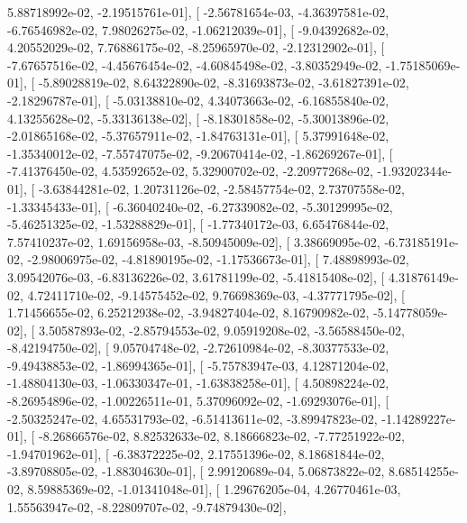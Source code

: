 \documentclass{article}
\begin{document}
          5.88718992e-02,  -2.19515761e-01],
       [ -2.56781654e-03,  -4.36397581e-02,  -6.76546982e-02,
          7.98026275e-02,  -1.06212039e-01],
       [ -9.04392682e-02,   4.20552029e-02,   7.76886175e-02,
         -8.25965970e-02,  -2.12312902e-01],
       [ -7.67657516e-02,  -4.45676454e-02,  -4.60845498e-02,
         -3.80352949e-02,  -1.75185069e-01],
       [ -5.89028819e-02,   8.64322890e-02,  -8.31693873e-02,
         -3.61827391e-02,  -2.18296787e-01],
       [ -5.03138810e-02,   4.34073663e-02,  -6.16855840e-02,
          4.13255628e-02,  -5.33136138e-02],
       [ -8.18301858e-02,  -5.30013896e-02,  -2.01865168e-02,
         -5.37657911e-02,  -1.84763131e-01],
       [  5.37991648e-02,  -1.35340012e-02,  -7.55747075e-02,
         -9.20670414e-02,  -1.86269267e-01],
       [ -7.41376450e-02,   4.53592652e-02,   5.32900702e-02,
         -2.20977268e-02,  -1.93202344e-01],
       [ -3.63844281e-02,   1.20731126e-02,  -2.58457754e-02,
          2.73707558e-02,  -1.33345433e-01],
       [ -6.36040240e-02,  -6.27339082e-02,  -5.30129995e-02,
         -5.46251325e-02,  -1.53288829e-01],
       [ -1.77340172e-03,   6.65476844e-02,   7.57410237e-02,
          1.69156958e-03,  -8.50945009e-02],
       [  3.38669095e-02,  -6.73185191e-02,  -2.98006975e-02,
         -4.81890195e-02,  -1.17536673e-01],
       [  7.48898993e-02,   3.09542076e-03,  -6.83136226e-02,
          3.61781199e-02,  -5.41815408e-02],
       [  4.31876149e-02,   4.72411710e-02,  -9.14575452e-02,
          9.76698369e-03,  -4.37771795e-02],
       [  1.71456655e-02,   6.25212938e-02,  -3.94827404e-02,
          8.16790982e-02,  -5.14778059e-02],
       [  3.50587893e-02,  -2.85794553e-02,   9.05919208e-02,
         -3.56588450e-02,  -8.42194750e-02],
       [  9.05704748e-02,  -2.72610984e-02,  -8.30377533e-02,
         -9.49438853e-02,  -1.86994365e-01],
       [ -5.75783947e-03,   4.12871204e-02,  -1.48804130e-03,
         -1.06330347e-01,  -1.63838258e-01],
       [  4.50898224e-02,  -8.26954896e-02,  -1.00226511e-01,
          5.37096092e-02,  -1.69293076e-01],
       [ -2.50325247e-02,   4.65531793e-02,  -6.51413611e-02,
         -3.89947823e-02,  -1.14289227e-01],
       [ -8.26866576e-02,   8.82532633e-02,   8.18666823e-02,
         -7.77251922e-02,  -1.94701962e-01],
       [ -6.38372225e-02,   2.17551396e-02,   8.18681844e-02,
         -3.89708805e-02,  -1.88304630e-01],
       [  2.99120689e-04,   5.06873822e-02,   8.68514255e-02,
          8.59885369e-02,  -1.01341048e-01],
       [  1.29676205e-04,   4.26770461e-03,   1.55563947e-02,
         -8.22809707e-02,  -9.74879430e-02],
\end{document}
